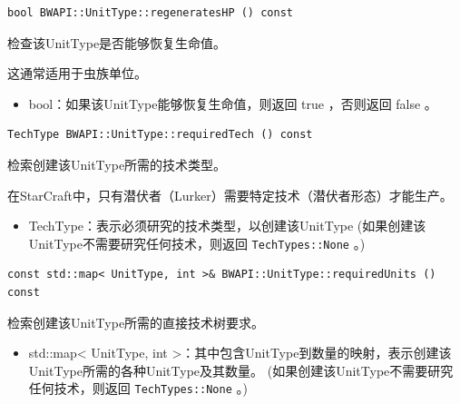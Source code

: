 \begin{tcolorbox}[colback=white, colframe=black!60!white, title=regeneratesHP(), arc=0mm]
    \begin{verbatim}
bool BWAPI::UnitType::regeneratesHP () const
    \end{verbatim}
    检查该UnitType是否能够恢复生命值。\par 这通常适用于虫族单位。
    \begin{return}
        \begin{itemize}
            \item bool：如果该UnitType能够恢复生命值，则返回   true  ，否则返回   false  。
        \end{itemize}
    \end{return}
\end{tcolorbox}


\begin{tcolorbox}[colback=white, colframe=black!60!white, title=requiredTech(), arc=0mm]
    \begin{verbatim}
TechType BWAPI::UnitType::requiredTech () const
    \end{verbatim}
    检索创建该UnitType所需的技术类型。
    \begin{note}
        在StarCraft中，只有潜伏者（Lurker）需要特定技术（潜伏者形态）才能生产。
    \end{note}
    \begin{return}
        \begin{itemize}
            \item TechType：表示必须研究的技术类型，以创建该UnitType
            (如果创建该UnitType不需要研究任何技术，则返回 \verb|TechTypes::None|  。)
        \end{itemize}
    \end{return}
\end{tcolorbox}


\begin{tcolorbox}[colback=white, colframe=black!60!white, title=requiredUnits(), arc=0mm]
    \begin{verbatim}
const std::map< UnitType, int >& BWAPI::UnitType::requiredUnits () const
    \end{verbatim}
    检索创建该UnitType所需的直接技术树要求。
    \begin{return}
        \begin{itemize}
            \item std::map< UnitType, int >：其中包含UnitType到数量的映射，表示创建该UnitType所需的各种UnitType及其数量。
            (如果创建该UnitType不需要研究任何技术，则返回 \verb|TechTypes::None|  。)
        \end{itemize}
    \end{return}
\end{tcolorbox}


